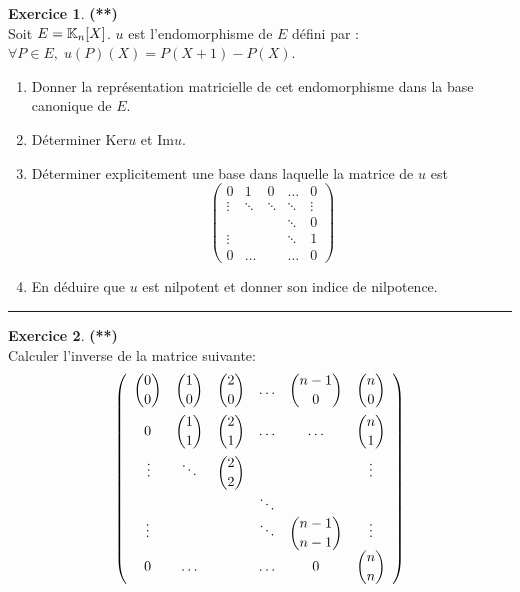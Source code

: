 \documentclass[a4paper,11pt]{article}
\theoremstyle{definition}
\newtheorem{exo}{Exercice} %
\begin{document}
\begin{minipage}{1\linewidth}\begin{minipage}[t]{0.48\linewidth}\raggedright
		
		\begin{exo}\textbf{(**)}\quad\\[0.2cm]
			Soit $E=\mathbb{K}_n[X]$. $u$ est l'endomorphisme de $E$ défini par : $\forall P\in E,\; u(P)(X)=P(X+1)-P(X)$.
			
			\begin{enumerate}
				\item Donner la représentation matricielle de cet endomorphisme dans la base canonique de $E$.
				\item  Déterminer $\text{Ker}u$  et $\text{Im}u$.
				
				\item  Déterminer explicitement une base dans laquelle la matrice de $u$ est  $$\left(
				\begin{array}{ccccc}
				0&1&0&\ldots&0\\
				\vdots&\ddots&\ddots&\ddots&\vdots\\
				& & &\ddots&0\\
				\vdots& & &\ddots&1\\
				0&\ldots& &\ldots&0
				\end{array}
				\right)$$
				\item En déduire que $u$ est nilpotent et donner son indice de nilpotence. 
			\end{enumerate}
			
			
			\centering\rule{1\linewidth}{0.6pt}\end{exo}
		
		
		
		
		
		\begin{exo}\textbf{(**)}\quad\\[0.2cm]
			Calculer l'inverse de la matrice suivante:
			 $$\left(
			\begin{array}{cccccc}
			\dbinom{0}{0}&\dbinom{1}{0}&\dbinom{2}{0}&\ldots&\dbinom{n-1}{0}&\dbinom{n}{0}\\
			\rule{0mm}{7mm}0&\dbinom{1}{1}&\dbinom{2}{1}&\ldots&\ldots&\dbinom{n}{1}\\
			\rule{0mm}{7mm}\vdots&\ddots&\dbinom{2}{2}& & &\vdots\\
			& & &\ddots& & \\
			\vdots& & &\ddots&\dbinom{n-1}{n-1}&\vdots\\
			0&\ldots& &\ldots&0&\dbinom{n}{n}
			\end{array}
			\right)$$
			

\end{exo}
\end{minipage}
\end{minipage}
\end{document}
